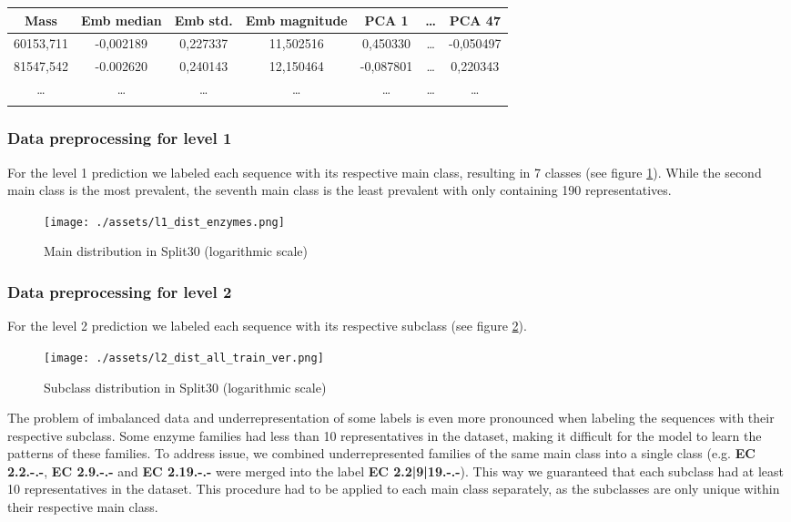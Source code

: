 \documentclass{bioinfo}
\begin{document}
\begin{methods}
\begin{table}[!htbp]
\setlength{\tabcolsep}{2pt}
 {
	\begin{tabular}{@{}ccccccc@{}}
		\toprule 
		Mass & Emb median & Emb std. & Emb magnitude & PCA 1 & \dots & PCA 47\\
		\midrule
		60153,711 & -0,002189 & 0,227337 & 11,502516 & 0,450330 & \dots & -0,050497\\
		81547,542 & -0.002620 & 0,240143 & 12,150464 & -0,087801 & \dots & 0,220343 \\
		\dots & \dots & \dots & \dots & \dots & \dots & \dots \\
		\botrule
    \end{tabular}
}{}
\end{table}

\subsubsection{Data preprocessing for level 1}
For the level 1 prediction we labeled each sequence with its respective main class,
resulting in 7 classes (see figure \ref{fig:l1_dist_train}).
While the second main class is the most prevalent, 
the seventh main class is the least prevalent with only
containing 190 representatives.

\begin{figure}[!htpb]
\texttt{[image: ./assets/l1\_dist\_enzymes.png]}
\caption{Main distribution in Split30 (logarithmic scale)}\label{fig:l1_dist_train}
\end{figure}


\subsubsection{Data preprocessing for level 2}
For the level 2 prediction we labeled each sequence with its respective subclass (see figure \ref{fig:l2_dist_train}).

\begin{figure}[!htpb]
\texttt{[image: ./assets/l2\_dist\_all\_train\_ver.png]}
\caption{Subclass distribution in Split30 (logarithmic scale)}\label{fig:l2_dist_train}
\end{figure}

The problem of imbalanced data and underrepresentation of some labels is even more pronounced when labeling the sequences with their respective subclass.
Some enzyme families had less than 10 representatives in the dataset, making it difficult for the model to learn the patterns of these families.
To address issue, we combined underrepresented families of the same main class into a single class 
(e.g. \textbf{EC 2.2.-.-}, \textbf{EC 2.9.-.-} and \textbf{EC 2.19.-.-} were merged into the label \textbf{EC 2.2|9|19.-.-}).
This way we guaranteed that each subclass had at least 10 representatives in the dataset.
This procedure had to be applied to each main class separately, as the subclasses are only unique within their respective main class.


\end{methods}
\end{document}
